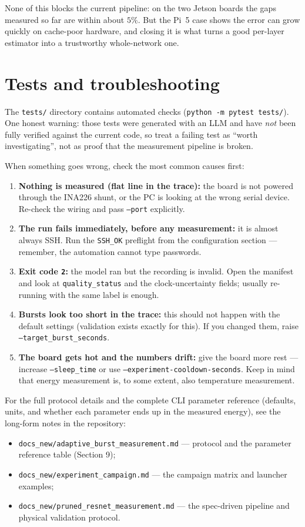 None of this blocks the current pipeline: on the two Jetson boards the gaps
measured so far are within about $5\%$. But the Pi~5 case shows the error
can grow quickly on cache-poor hardware, and closing it is what turns a
good per-layer estimator into a trustworthy whole-network one.

\section{Tests and troubleshooting}

The \texttt{tests/} directory contains automated checks
(\texttt{python -m pytest tests/}). One honest warning: those tests were
generated with an LLM and have \emph{not} been fully verified against the
current code, so treat a failing test as ``worth investigating'', not as
proof that the measurement pipeline is broken.

When something goes wrong, check the most common causes first:

\begin{enumerate}
    \item \textbf{Nothing is measured (flat line in the trace):} the board
    is not powered through the INA226 shunt, or the PC is looking at the
    wrong serial device. Re-check the wiring and pass \texttt{--port}
    explicitly.
    \item \textbf{The run fails immediately, before any measurement:} it is
    almost always SSH. Run the \texttt{SSH\_OK} preflight from the
    configuration section --- remember, the automation cannot type
    passwords.
    \item \textbf{Exit code \texttt{2}:} the model ran but the recording is
    invalid. Open the manifest and look at \texttt{quality\_status} and the
    clock-uncertainty fields; usually re-running with the same label is
    enough.
    \item \textbf{Bursts look too short in the trace:} this should not
    happen with the default settings (validation exists exactly for this).
    If you changed them, raise \texttt{--target\_burst\_seconds}.
    \item \textbf{The board gets hot and the numbers drift:} give the board
    more rest --- increase \texttt{--sleep\_time} or use
    \texttt{--experiment-cooldown-seconds}. Keep in mind that energy
    measurement is, to some extent, also temperature measurement.
\end{enumerate}

For the full protocol details and the complete CLI parameter reference
(defaults, units, and whether each parameter ends up in the measured
energy), see the long-form notes in the repository:
\begin{itemize}
    \item \texttt{docs\_new/adaptive\_burst\_measurement.md} --- protocol
    and the parameter reference table (Section 9);
    \item \texttt{docs\_new/experiment\_campaign.md} --- the campaign
    matrix and launcher examples;
    \item \texttt{docs\_new/pruned\_resnet\_measurement.md} --- the spec-driven
    pipeline and physical validation protocol.
\end{itemize}


